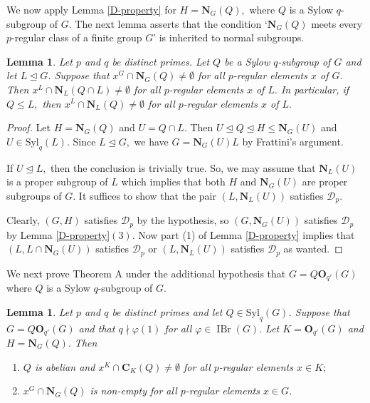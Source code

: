 \documentclass[12pt]{amsart}
\newtheorem{lemma}[theorem]{Lemma}
\newtheorem*{question}{Question}
\theoremstyle{remark}
\numberwithin{equation}{section}
\begin{document}
\iffalse
The following question might be of some interest:
\begin{question} Classify all finite groups $G$ with a proper subgroup $H$ such that all $H$-derangements of $G$ have order divisible by some fixed prime $p.$
\end{question}
\fi
We now apply Lemma \ref{D-property} for $H={\mathbf{N}}_G(Q),$ where $Q$ is a Sylow $q$-subgroup of $G.$ The next lemma asserts that the condition `${\mathbf{N}}_G(Q)$ meets every $p$-regular class of a finite group $G$'  is inherited to normal subgroups.

\begin{lemma}\label{lem6}
Let $p$ and $q$ be distinct primes. Let $Q$ be a Sylow $q$-subgroup of $G$ and let $L\unlhd G$. Suppose that $x^G\cap {\mathbf{N}}_G(Q)\neq\emptyset$ for all $p$-regular elements $x$ of $G.$ Then $x^L\cap {\mathbf{N}}_L(Q\cap L)\neq\emptyset$ for all $p$-regular elements $x$ of $L.$ In particular, if $Q\leq L,$ then $x^L\cap {\mathbf{N}}_L(Q)\neq\emptyset$ for all $p$-regular elements $x$ of $L.$
\end{lemma}

\begin{proof} Let $H={\mathbf{N}}_G(Q)$ and $U=Q\cap L.$ Then $U\unlhd Q\unlhd H\le {\mathbf{N}}_G(U)$ and $U\in{{\mathrm {Syl}}}_q(L).$ Since $L\unlhd G,$ we have $G={\mathbf{N}}_G(U)L$ by Frattini's argument.

If $U\unlhd L,$ then the conclusion is trivially true. So, we may assume that ${\mathbf{N}}_L(U)$ is a proper subgroup of $L$ which implies that both $H$ and ${\mathbf{N}}_G(U)$ are proper subgroups of $G.$ It suffices to show that the pair $(L,{\mathbf{N}}_L(U))$ satisfies $\mathcal{D}_p.$

Clearly, $(G,H)$ satisfies $\mathcal{D}_p$ by the hypothesis, so $(G,{\mathbf{N}}_G(U))$ satisfies $\mathcal{D}_p$ by Lemma \ref{D-property}$(3).$ Now part (1) of Lemma \ref{D-property} implies that $(L,L\cap {\mathbf{N}}_G(U))$ satisfies ${{\mathcal D}}_p$ or $(L, {\mathbf{N}}_L(U))$ satisfies ${{\mathcal D}}_p$ as wanted.
\end{proof}

We next prove Theorem A under the additional hypothesis that $G = Q{\mathbf{O}}_{q'} (G)$ where $Q$ is a Sylow $q$-subgroup of $G$.

\begin{lemma}\label{lem3}
 Let $p$ and $q$ be distinct primes and let $Q\in{{\mathrm {Syl}}}_q(G)$. Suppose that $G=Q{\mathbf{O}}_{q'}(G)$ and that $q\nmid \varphi(1)$ for all $\varphi\in\operatorname{IBr}(G).$ Let $K={\mathbf{O}}_{q'}(G)$ and $H={\mathbf{N}}_G(Q).$ Then
 \begin{enumerate}
 \item $Q$ is abelian and $x^K\cap{\mathbf{C}}_K(Q)\neq\emptyset$ for all $p$-regular elements $x\in K;$
 \item $x^G\cap {\mathbf{N}}_G(Q)$ is non-empty for all $p$-regular elements $x\in G$.
 \end{enumerate}
\end{lemma}
\end{document}
